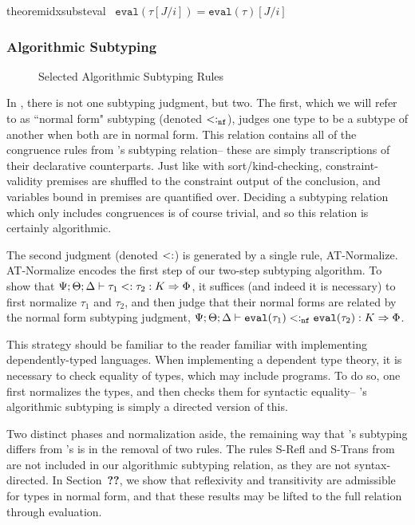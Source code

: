 \begin{restatable}{theorem}{idxsubsteval}
~$\texttt{eval}(\tau[J/i]) = \texttt{eval}(\tau)[J/i]$
\label{thm:idx-subst-eval}
\end{restatable}

\subsubsection{Algorithmic Subtyping}

\begin{figure}

\caption{Selected Algorithmic Subtyping Rules}
\label{fig:bilambdaamor-selected-subty-rules}
\end{figure}

In \bilambdaamor, there is not one subtyping judgment, but two. The first, which we will refer to as ``normal form" subtyping (denoted $<:_{\texttt{nf}}$),  judges one type to be a subtype of another when both are in normal form. This relation contains all of the congruence rules from \dlambdaamor's subtyping relation-- these are simply transcriptions of their declarative counterparts. Just like with sort/kind-checking, constraint-validity premises are shuffled to the constraint output of the conclusion, and variables bound in premises are quantified over. Deciding a subtyping relation which only includes congruences is of course trivial, and so this relation is certainly algorithmic.

The second judgment (denoted $<:$) is generated by a single rule, AT-Normalize. AT-Normalize encodes the first step of our two-step subtyping algorithm.
To show that $\Psi ; \Theta ; \Delta \vdash \tau_1 <: \tau_2 : K \Rightarrow \Phi$, it suffices (and indeed it is necessary) to first normalize $\tau_1$ and $\tau_2$, and then judge that their normal forms are related by the normal form subtyping judgment, $\Psi ; \Theta ; \Delta \vdash \texttt{eval}(\tau_1) <:_{\texttt{nf}} \texttt{eval}(\tau_2) : K \Rightarrow \Phi$.
 
This strategy should be familiar to the reader familiar with implementing dependently-typed languages. When implementing a dependent type theory, it is necessary to check equality of types, which may include programs. To do so, one first normalizes the types, and then checks them for syntactic equality-- \bilambdaamor's algorithmic subtyping is simply a directed version of this.

Two distinct phases and normalization aside, the remaining way that \bilambdaamor's subtyping differs from \dlambdaamor's is in the removal of two rules. The rules S-Refl and S-Trans from \dlambdaamor are not included in our algorithmic subtyping relation, as they are not syntax-directed. In Section~\textbf{??}, we show that reflexivity and transitivity are admissible for types in normal form, and that these results may be lifted to the full relation through evaluation.


